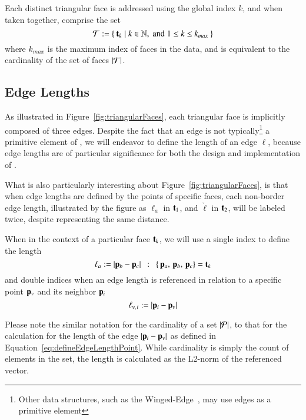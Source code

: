 Each distinct triangular face is addressed using the global index $k$, and when taken together, comprise the set
%
\begin{equation}
	\mathcal{T} := \left \{\:\mathbf{t}_k \mid k \in \mathbb{N}, \;\text{and}\; 1\leq k \leq k_{max}\:\right \}
	\label{eq:defineSetOfFaces}
\end{equation}
%
where $k_{max}$ is the maximum index of faces in the data, and is equivalent to the cardinality of the set of faces $|\mathcal{T}|$.%
%
%

%
%
%
\subsection{Edge Lengths}
\label{ch2s3ssEL}
As illustrated in Figure~\ref{fig:triangularFaces}, each triangular face is implicitly composed of three edges. Despite the fact that an edge is not typically\footnote{Other data structures, such as the Winged-Edge~\cite[p.~1]{Baumgart75}, may use edges as a primitive element} a primitive element of \tdd{}, we will endeavor to define the length of an edge $\ell$, because edge lengths are of particular significance for both the design and implementation of .

What is also particularly interesting about Figure~\ref{fig:triangularFaces}, is that when edge lengths are defined by the points of specific faces, each non-border edge length, illustrated by the figure as $\ell_a$ in $\mathbf{t}_1$, and $\check{\ell}$ in $\mathbf{t}_2$, will be labeled twice, despite representing the same distance.

When in the context of a particular face $\mathbf{t}_k$, we will use a single index to define the length
%
\begin{equation}
	\ell_a := |\mathbf{p}_b - \mathbf{p}_c| \enspace:\enspace \left \{\,\mathbf{p}_a,\,\mathbf{p}_b,\,\mathbf{p}_c\right \} = \mathbf{t}_k
	\label{eq:defineEdgeLengthFace}
\end{equation}%
%
%
and double indices when an edge length is referenced in relation to a specific point $\mathbf{p}_v$ and its neighbor $\mathbf{p}_i$
%
\begin{equation}
	\ell_{v,\kern.75pt i} := |\mathbf{p}_i - \mathbf{p}_v|
	\label{eq:defineEdgeLengthPoint}
\end{equation}%
%

Please note the similar notation for the cardinality of a set $|\mathcal{P}|$, to that for the calculation for the length of the edge $|\mathbf{p}_i - \mathbf{p}_v|$ as defined in Equation~\ref{eq:defineEdgeLengthPoint}. While cardinality is simply the count of elements in the set, the length is calculated as the L2-norm of the referenced vector.~\cite[p.~26]{Mara12}

